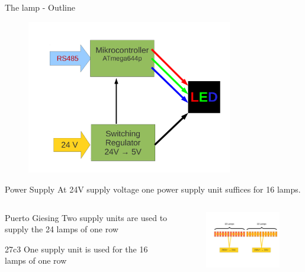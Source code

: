 \documentclass{beamer}
\begin{document}
  \begin{frame}{The lamp - Outline}
    \begin{figure}
    \begin{center}
    \includegraphics[width=9cm]{bilder/led_12v_rs485.pdf}
    \end{center}
    \end{figure}
  \end{frame}
  \begin{frame}{Power Supply}
  At 24V supply voltage one power supply unit suffices for 16 lamps.
  \begin{columns}
    \begin{column}{4cm}
     \begin{block}{ Puerto Giesing}
     Two supply units are used to supply the 24 lamps of one row
     \end{block}
     \begin{block}{27c3}
     One supply unit is used for the 16 lamps of one row
     \end{block}
    \end{column}
    \begin{column}{7cm}
    \begin{figure}
    \includegraphics[width=7cm, clip, trim= 2.5cm 4.6cm 0.5cm 4cm]{bilder/12lampen.pdf}
    \end{figure}
    \end{column}
  \end{columns}
  \end{frame}
\end{document}
